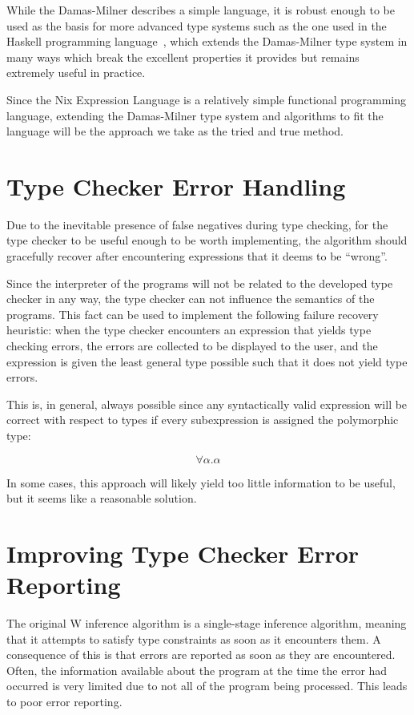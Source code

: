 \documentclass[a4paper,conference]{IEEEtran}
\begin{document}
While the Damas-Milner describes a simple language, it is robust enough to be used as the basis for more advanced type systems such as the one used in the Haskell programming language~\cite{jones1999typing}, which extends the Damas-Milner type system in many ways which break the excellent properties it provides but remains extremely useful in practice.

Since the Nix Expression Language is a relatively simple functional programming language, extending the Damas-Milner type system and algorithms to fit the language will be the approach we take as the tried and true method.

\section{Type Checker Error Handling}

Due to the inevitable presence of false negatives during type checking, for the type checker to be useful enough to be worth implementing, the algorithm should gracefully recover after encountering expressions that it deems to be ``wrong''.

Since the interpreter of the programs will not be related to the developed type checker in any way, the type checker can not influence the semantics of the programs. This fact can be used to implement the following failure recovery heuristic: when the type checker encounters an expression that yields type checking errors, the errors are collected to be displayed to the user, and the expression is given the least general type possible such that it does not yield type errors.

This is, in general, always possible since any syntactically valid expression will be correct with respect to types if every subexpression is assigned the polymorphic type:

\begin{equation}
  \forall \alpha. \alpha
\end{equation}

In some cases, this approach will likely yield too little information to be useful, but it seems like a reasonable solution.

\section{Improving Type Checker Error Reporting}

The original W inference algorithm is a single-stage inference algorithm, meaning that it attempts to satisfy type constraints as soon as it encounters them. A consequence of this is that errors are reported as soon as they are encountered. Often, the information available about the program at the time the error had occurred is very limited due to not all of the program being processed. This leads to poor error reporting.
\end{document}
